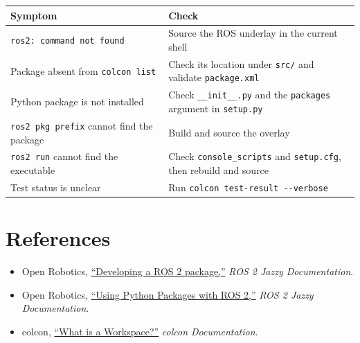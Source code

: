 \documentclass[
  australian,
  12pt,
  letterpaper,
  DIV=11,
  numbers=noendperiod,
  twoside]{scrreprt}
\newcounter{none} %
\providecommand{\tightlist}{%
  \setlength{\itemsep}{0pt}\setlength{\parskip}{0pt}}
\begin{document}
{\def\LTcaptype{none} %
\begin{longtable}[]{@{}
  >{\raggedright\arraybackslash}p{}
  >{\raggedright\arraybackslash}p{}@{}}
\toprule\noalign{}
\begin{minipage}[b]{\linewidth}\raggedright
Symptom
\end{minipage} & \begin{minipage}[b]{\linewidth}\raggedright
Check
\end{minipage} \\
\midrule\noalign{}
\endhead
\bottomrule\noalign{}
\endlastfoot
\texttt{ros2:\ command\ not\ found} & Source the ROS underlay in the
current shell \\
Package absent from \texttt{colcon\ list} & Check its location under
\texttt{src/} and validate \texttt{package.xml} \\
Python package is not installed & Check \texttt{\_\_init\_\_.py} and the
\texttt{packages} argument in \texttt{setup.py} \\
\texttt{ros2\ pkg\ prefix} cannot find the package & Build and source
the overlay \\
\texttt{ros2\ run} cannot find the executable & Check
\texttt{console\_scripts} and \texttt{setup.cfg}, then rebuild and
source \\
Test status is unclear & Run
\texttt{colcon\ test-result\ -\/-verbose} \\
\end{longtable}
}

\section*{References}\label{references-3}


\begin{itemize}
\tightlist
\item
  Open Robotics,
  \href{https://docs.ros.org/en/jazzy/How-To-Guides/Developing-a-ROS-2-Package.html}{``Developing
  a ROS 2 package,''} \emph{ROS 2 Jazzy Documentation}.
\item
  Open Robotics,
  \href{https://docs.ros.org/en/jazzy/How-To-Guides/Using-Python-Packages.html}{``Using
  Python Packages with ROS 2,''} \emph{ROS 2 Jazzy Documentation}.
\item
  colcon,
  \href{https://colcon.readthedocs.io/en/released/user/what-is-a-workspace.html}{``What
  is a Workspace?''} \emph{colcon Documentation}.
\end{itemize}
\end{document}
